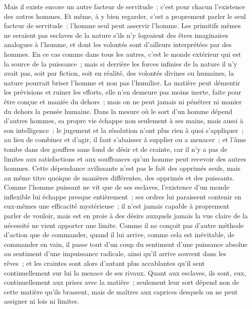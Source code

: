 \documentclass[french,twoside]{book} %
\begin{document}
Mais il existe encore un autre facteur de servitude ; c'est pour chacun l'existence des autres hommes. Et même, à y bien regarder, c'est a proprement parler le seul facteur de servitude ; l'homme seul peut asservir l'homme. Les primitifs mêmes ne seraient pas esclaves de la nature s'ils n'y logeaient des êtres imaginaires analogues à l'homme, et dont les volontés sont d'ailleurs interprétées par des hommes. En ce cas comme dans tous les autres, c'est le monde extérieur qui est la source de la puissance ; mais si derrière les forces infinies de la nature il n'y avait pas, soit par fiction, soit en réalité, des volontés divines ou humaines, la nature pourrait briser l'homme et non pas l'humilier. La matière peut démentir les prévisions et ruiner les efforts, elle n'en demeure pas moins inerte, faite pour être conçue et maniée du dehors ; mais on ne peut jamais ni pénétrer ni manier du dehors la pensée humaine. Dans la mesure où le sort d'un homme dépend d'autres hommes, sa propre vie échappe non seulement à ses mains, mais aussi à son intelligence ; le jugement et la résolution n'ont plus rien à quoi s'appliquer ; au lieu de combiner et d'agir, il faut s'abaisser à supplier ou a menacer ; et l'âme tombe dans des gouffres sans fond de désir et de crainte, car il n'y a pas de limites aux satisfactions et aux souffrances qu'un homme peut recevoir des autres hommes. Cette dépendance avilissante n'est pas le fait des opprimés seuls, mais au même titre quoique de manières différentes, des opprimés et des puissants. Comme l'homme puissant ne vit que de ses esclaves, l'existence d'un monde inflexible lui échappe presque entièrement ; ses ordres lui paraissent contenir en eux-mêmes une efficacité mystérieuse ; il n'est jamais capable à proprement parler de vouloir, mais est en proie à des désirs auxquels jamais la vue claire de la nécessité ne vient apporter une limite. Comme il ne conçoit pas d'autre méthode d'action que de commander, quand il lui arrive, comme cela est inévitable, de commander en vain, il passe tout d'un coup du sentiment d'une puissance absolue au sentiment d'une impuissance radicale, ainsi qu'il arrive souvent dans les rêves ; et les craintes sont alors d'autant plus accablantes qu'il sent continuellement sur lui la menace de ses rivaux. Quant aux esclaves, ils sont, eux, continuellement aux prises avec la matière ; seulement leur sort dépend non de cette matière qu'ils brassent, mais de maîtres aux caprices desquels on ne peut assigner ni lois ni limites.\par
\end{document}
